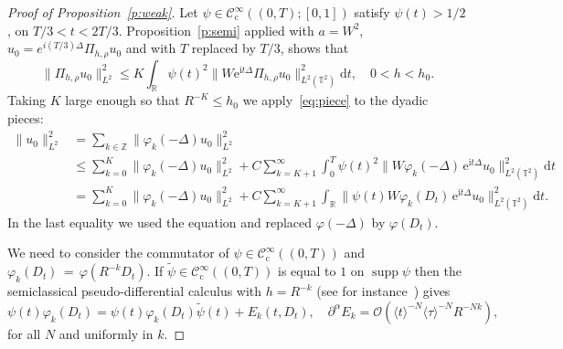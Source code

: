 \documentclass[11pt]{article}
\theoremstyle{definition}
\numberwithin{equation}{section}
\numberwithin{figure}{section}
\numberwithin{table}{section}
\DeclareMathOperator{\supp}{supp}
\newcommand{\CIc}{{\mathcal C}^\infty_{\mathrm{c}} }
\newcommand{\R}{{\mathbb R}}
\newcommand{\TT}{{\mathbb T}}
\newcommand{\ZZ}{{\mathbb Z}}
\newcommand*{\dd}{\mathrm{d}}
\newcommand*{\dt}{\dd t}
\begin{document}
\begin{proof}[Proof of Proposition~\ref{p:weak}]
Let $\psi \in \CIc ((0, T) ; [0, 1]) $ satisfy $\psi (t) > 1/2$, on $ T/3 < t < 2T / 3 $. Proposition~\ref{p:semi} applied with $ a = W^2 $, $ u_0 = e^{ i (T/3) \Delta } \Pi_{h, \rho } u_0 $ and with $ T $ replaced by $ T/3 $, shows that
\begin{equation}\label{eq:piece}
\|\Pi_{h, \rho } u_0\|_{L^2}^2 \leq K \int_\R \psi(t)^2 \| W \mathrm{e}^{\mathrm{i} t \Delta } \Pi_{h, \rho } u_0\|_{L^2 (\TT^2) }^2 \dt, \quad 0 < h < h_0.
\end{equation}
Taking $K $ large enough so that $R^{-K } \leq h_{0}$ we apply~\eqref{eq:piece} to the dyadic pieces:
\begin{align*}
\|u_0 \|^2_{L^2} & =\sum_{ k \in \ZZ } \|\varphi_{k}(-\Delta)u_0\|_{L^2}^2 \\
&\leq \sum_{k=0}^{K } \|\varphi_{k}(-\Delta)u_0\|_{L^2}^2 +C
\sum_{k=K +1}^\infty \int_{0}^T \psi (t) ^2 \| W \varphi_{k}(-\Delta)\,
\mathrm{e}^{\mathrm{i}t \Delta } u_0\|_{L^2(\TT^2) } ^2 \dt \\
& = \sum_{k=0}^{K } \|\varphi_{k}(-\Delta)u_0\|_{L^2}^2 + C
\sum_{k=K +1}^\infty \int_\R \| \psi (t) W \varphi_{k}(D_t)
\,\mathrm{e}^{\mathrm{i}t \Delta } u_0\|_{L^2(\TT^2) } ^2 \dt.
\end{align*}
In the last equality we used the equation and replaced $ \varphi (-\Delta) $ by $
\varphi (D_t) $.

We need to consider the commutator of $ \psi \in \CIc ((0, T)) $ and $
\varphi_{k} (D_t)\,{=}\,\varphi (R^{-k} D_t) $. If $
\widetilde \psi \in \CIc ((0,T))$ is equal to $ 1 $ on $
\supp \psi$ then the semiclassical pseudo-differential calculus with $ h = R ^{-k}$ (see for instance~\cite[Chapter~4]{EZB}) gives
\begin{equation}\label{eq:wideps}
\psi (t) \varphi_{k} (D_t) = \psi (t) \varphi_{k} (D_t) \widetilde \psi (t) + E _k (t, D_t),\quad
\partial^\alpha E_k = {\mathcal O} (\langle t \rangle^{-N } \langle
\tau \rangle^{-N} R ^{- N k }),
\end{equation}
for all $ N$ and uniformly in $ k $.


\end{proof}
\end{document}
